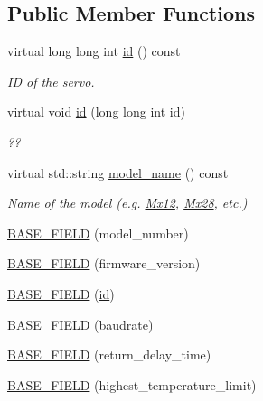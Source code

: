 \subsection*{Public Member Functions}
\begin{DoxyCompactItemize}
\item 
virtual long long int \hyperlink{classdynamixel_1_1servos_1_1_base_servo_a191c1596a4fcbe43cc7b9292f83e196b}{id} () const 
\begin{DoxyCompactList}\small\item\em ID of the servo. \end{DoxyCompactList}\item 
virtual void \hyperlink{classdynamixel_1_1servos_1_1_base_servo_a20e7410262e37dcd177e81a41d78d8ba}{id} (long long int id)
\begin{DoxyCompactList}\small\item\em ?? \end{DoxyCompactList}\item 
virtual std\+::string \hyperlink{classdynamixel_1_1servos_1_1_base_servo_a0878d6f74b1a26bf23fa53a296fd8283}{model\+\_\+name} () const 
\begin{DoxyCompactList}\small\item\em Name of the model (e.\+g. \hyperlink{classdynamixel_1_1servos_1_1_mx12}{Mx12}, \hyperlink{classdynamixel_1_1servos_1_1_mx28}{Mx28}, etc.) \end{DoxyCompactList}\item 
\hyperlink{classdynamixel_1_1servos_1_1_base_servo_ae136ad4ba45eddc402d3638f42d4cbbd}{B\+A\+S\+E\+\_\+\+F\+I\+E\+LD} (model\+\_\+number)
\item 
\hyperlink{classdynamixel_1_1servos_1_1_base_servo_aa700a94b75b928640dbcd887417db861}{B\+A\+S\+E\+\_\+\+F\+I\+E\+LD} (firmware\+\_\+version)
\item 
\hyperlink{classdynamixel_1_1servos_1_1_base_servo_af3eded69e54365d754ba7715c9af57ae}{B\+A\+S\+E\+\_\+\+F\+I\+E\+LD} (\hyperlink{classdynamixel_1_1servos_1_1_base_servo_a191c1596a4fcbe43cc7b9292f83e196b}{id})
\item 
\hyperlink{classdynamixel_1_1servos_1_1_base_servo_a48bfb690093b070720aa7ca522ab6b1a}{B\+A\+S\+E\+\_\+\+F\+I\+E\+LD} (baudrate)
\item 
\hyperlink{classdynamixel_1_1servos_1_1_base_servo_abe54af60eda15894e0be32fe7c447906}{B\+A\+S\+E\+\_\+\+F\+I\+E\+LD} (return\+\_\+delay\+\_\+time)
\item 
\hyperlink{classdynamixel_1_1servos_1_1_base_servo_ac3c0ffaea0c5adb2245a875bdd0d9a15}{B\+A\+S\+E\+\_\+\+F\+I\+E\+LD} (highest\+\_\+temperature\+\_\+limit)

\end{DoxyCompactItemize}
